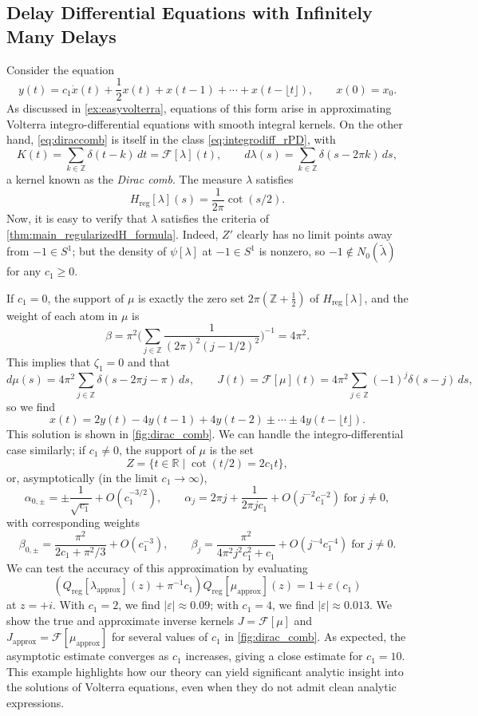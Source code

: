 \documentclass{cams-l} %
\newcommand{\dave}[1]{#1}\newcommand{\davebegin}{}\newcommand{\daveend}{}\newcommand{\george}[1]{#1}
\newcommand{\RR}{\mathbb R}
\newcommand{\ZZ}{\mathbb Z}
\newcommand{\cF}{\mathcal F}
\newcommand{\eps}{\varepsilon}
\theoremstyle{definition}
\theoremstyle{remark}
\numberwithin{equation}{section}
\begin{document}
\subsection{Delay Differential Equations with Infinitely Many Delays}\label{sec:diraccomb}
    Consider the equation
    \begin{equation}\label{eq:diraccomb}
        y(t) = c_1\dot{x}(t) + \frac{1}{2}x(t) + x(t-1) + \cdots + x(t-\lfloor t\rfloor),\qquad x(0) = x_0.
    \end{equation}
    As discussed in \cref{ex:easyvolterra}, equations of this form arise in approximating Volterra integro-differential equations with smooth integral kernels. On the other hand, \cref{eq:diraccomb} is itself in the class \ref{eq:integrodiff_rPD}, with
    \dave{\[K(t) = \sum_{k\in\ZZ}\delta(t-k)\,dt = \cF[\lambda](t),\qquad d\lambda(s) = \sum_{k\in\ZZ}\delta(s-2\pi k)\,ds,\]
    a kernel known as the \emph{Dirac comb}. The measure $\lambda$ satisfies}
    \[H_\mathrm{reg}[\lambda](s) = \frac{1}{2\pi}\cot(s/2).\]
    Now, it is easy to verify that $\lambda$ satisfies the criteria of \cref{thm:main_regularizedH_formula}. Indeed, $Z'$ clearly has no limit points away from $-1\in S^1$; but the density of $\psi[\lambda]$ at $-1\in S^1$ is nonzero, so $-1\notin N_0(\widetilde{\lambda})$ for any $c_1 \geq 0$.

    If $c_1=0$, the support of $\mu$ is exactly the zero set $2\pi(\ZZ+\frac{1}{2})$ of $H_\mathrm{reg}[\lambda]$, and the weight of each atom in $\mu$ is
    \[\beta = \pi^2\Bigg(\sum_{j\in\ZZ}\frac{1}{(2\pi)^2(j - 1/2)^2}\Bigg)^{-1} = 4\pi^2.\]
    This implies that $\zeta_1=0$ and that
    \[d\mu(s) = 4\pi^2\sum_{j\in\ZZ}\delta(s-2\pi j-\pi
    )\,ds,\qquad J(t) = \cF[\mu](t) = 4\pi^2\sum_{j\in\ZZ} (-1)^j\delta(s-j)\,ds,\]
    so we find
    \[x(t) = 2y(t) - 4y(t-1) + 4y(t-2) \pm\cdots \pm 4y(t-\lfloor t\rfloor).\]
    This solution is shown in \cref{fig:dirac_comb}. We can handle the integro-differential case similarly; if $c_1\neq 0$, the support of $\mu$ is the set
    \[Z=\{t\in\RR\;|\;\cot(t/2) = 2c_1t\},\]
    or, asymptotically (in the limit $c_1\to\infty$),
    \[\alpha_{0,\pm} = \pm \frac{1}{\sqrt{c_1}} + O(c_1^{-3/2}),\qquad \alpha_j = 2\pi j + \frac{1}{2\pi j c_1} + O(j^{-2}c_1^{-2}) \;\text{for}\;j\neq 0,\]
    with corresponding weights
    \[\beta_{0,\pm} = \frac{\pi^2}{2c_1+\pi^2/3} + O(c_1^{-3}),\qquad \beta_{j} = \frac{\pi^2}{4\pi^2j^2c_1^2+c_1} + O(j^{-4}c_1^{-4})\;\text{for}\;j\neq 0.\]
    We can test the accuracy of this approximation by evaluating
    \[(Q_\mathrm{reg}[\lambda_\mathrm{approx}](z) + \pi^{-1}c_1)Q_\mathrm{reg}[\mu_\mathrm{approx}](z) = 1 + \eps(c_1)\]
    at $z=+i$. With $c_1=2$, we find $|\eps|\approx 0.09$; with $c_1=4$, we find $|\eps|\approx 0.013$. We show the true and approximate inverse kernels $J = \cF[\mu]$ and $J_\mathrm{approx} = \cF[\mu_\mathrm{approx}]$ for several values of $c_1$ in \cref{fig:dirac_comb}. As expected, the asymptotic estimate converges as $c_1$ increases, giving a close estimate for $c_1=10$. This example highlights how our theory can yield significant analytic insight into the solutions of Volterra equations, even when they do not admit \dave{clean} analytic expressions.
\end{document}
